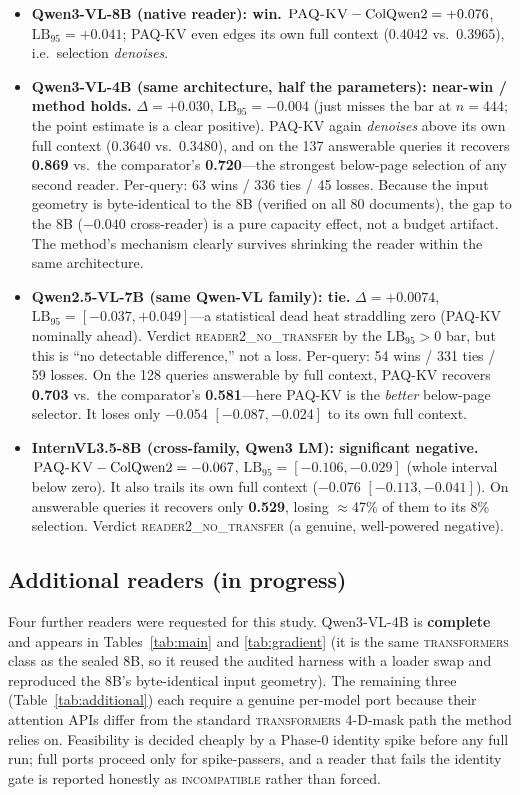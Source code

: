 \documentclass[letterpaper]{article} %
\newcommand{\paqc}{\textsc{PAQ-KV}}
\newcommand{\lb}{\mathrm{LB}_{95}}
\begin{document}
\begin{itemize}
\item \textbf{Qwen3-VL-8B (native reader): win.} $\paqc{}-\textrm{ColQwen2}=+0.076$, $\lb=+0.041$; \paqc{} even edges
its own full context ($0.4042$ vs.\ $0.3965$), i.e.\ selection \emph{denoises}.
\item \textbf{Qwen3-VL-4B (same architecture, half the parameters): near-win / method holds.} $\Delta=+0.030$,
$\lb=-0.004$ (just misses the bar at $n=444$; the point estimate is a clear positive). \paqc{} again \emph{denoises}
above its own full context ($0.3640$ vs.\ $0.3480$), and on the 137 answerable queries it recovers \textbf{0.869} vs.\
the comparator's \textbf{0.720}---the strongest below-page selection of any second reader. Per-query: 63 wins / 336
ties / 45 losses. Because the input geometry is byte-identical to the 8B (verified on all 80 documents), the gap to
the 8B ($-0.040$ cross-reader) is a pure capacity effect, not a budget artifact. The method's mechanism clearly
survives shrinking the reader within the same architecture.
\item \textbf{Qwen2.5-VL-7B (same Qwen-VL family): tie.} $\Delta=+0.0074$, $\lb=[-0.037,+0.049]$---a statistical dead
heat straddling zero (\paqc{} nominally ahead). Verdict \textsc{reader2\_no\_transfer} by the $\lb>0$ bar, but this is
``no detectable difference,'' not a loss. Per-query: 54 wins / 331 ties / 59 losses. On the 128 queries answerable by
full context, \paqc{} recovers \textbf{0.703} vs.\ the comparator's \textbf{0.581}---here \paqc{} is the \emph{better}
below-page selector. It loses only $-0.054$ $[-0.087,-0.024]$ to its own full context.
\item \textbf{InternVL3.5-8B (cross-family, Qwen3 LM): significant negative.}
$\paqc{}-\textrm{ColQwen2}=-0.067$, $\lb=[-0.106,-0.029]$ (whole interval below zero). It also trails its own full
context ($-0.076$ $[-0.113,-0.041]$). On answerable queries it recovers only \textbf{0.529}, losing $\approx$47\% of
them to its 8\% selection. Verdict \textsc{reader2\_no\_transfer} (a genuine, well-powered negative).
\end{itemize}

\subsection{Additional readers (in progress)}
\label{sec:additional}
Four further readers were requested for this study. Qwen3-VL-4B is \textbf{complete} and appears in
Tables~\ref{tab:main} and \ref{tab:gradient} (it is the same \textsc{transformers} class as the sealed 8B, so it
reused the audited harness with a loader swap and reproduced the 8B's byte-identical input geometry). The remaining
three (Table~\ref{tab:additional}) each require a genuine per-model port because their attention APIs differ from the
standard \textsc{transformers} 4-D-mask path the method relies on. Feasibility is decided cheaply by a Phase-0 identity
spike before any full run; full ports proceed only for spike-passers, and a reader that fails the identity gate is
reported honestly as \textsc{incompatible} rather than forced.
\end{document}
